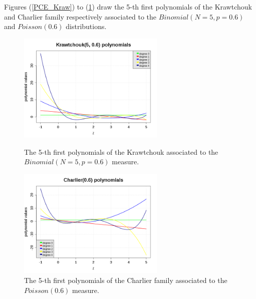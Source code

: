 Figures (\ref{PCE_Kraw}) to (\ref{PCE_Char}) draw the  5-th first polynomials of the Krawtchouk and Charlier  family respectively associated to the $Binomial(N=5,p=0.6)$ and $Poisson(0.6)$ distributions.



\begin{figure}[H]
  \begin{minipage}{9cm}
    \begin{center}
      \includegraphics[width=7cm]{PCE_KrawtchoukPolynomials.png}
      \caption{The 5-th first polynomials of the Krawtchouk associated to the  $Binomial(N=5,p=0.6)$ measure.}
      \label{PCE_Kraw}
    \end{center}
  \end{minipage}
  \hfill
  \begin{minipage}{9cm}
    \begin{center}
      \includegraphics[width=7cm]{PCE_CharlierPolynomials.png}
      \caption{The 5-th first polynomials of the Charlier  family associated to the $Poisson(0.6)$ measure.}
      \label{PCE_Char}
    \end{center}
  \end{minipage}
\end{figure}

